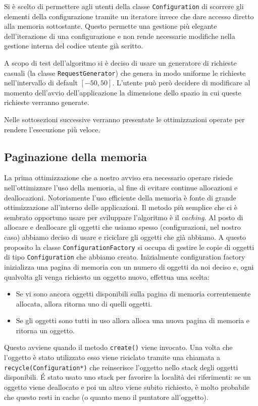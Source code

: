 \documentclass[a4paper, 10pt]{article}
\begin{document}
Si è scelto di permettere agli utenti della 
classe \texttt{Configuration} di scorrere gli elementi della configurazione
tramite un iteratore invece che dare accesso diretto alla memoria sottostante.
Questo permette una gestione più elegante dell'iterazione di una configurazione e non rende necessarie modifiche nella gestione interna del codice utente già scritto.

A scopo di test dell'algoritmo si è deciso di usare un generatore di richieste
casuali (la classe \texttt{RequestGenerator}) che genera in modo uniforme le 
richieste nell'intervallo di default $[-50, 50]$. L'utente può però decidere di modificare al momento dell'avvio dell'applicazione la dimensione dello spazio in cui queste richieste verranno generate. 

Nelle sottosezioni successive verranno presentate le ottimizzazioni operate
per rendere l'esecuzione più veloce. 

\subsection{Paginazione della memoria}
La prima ottimizzazione che a nostro avviso era necessario operare risiede 
nell'ottimizzare l'uso della memoria, al fine di evitare continue allocazioni e
deallocazioni. Notoriamente l'uso efficiente della memoria è fonte di grande
ottimizzazione all'interno delle applicazioni. Il metodo più semplice che 
ci è sembrato opportuno usare per sviluppare l'algoritmo è il \emph{caching}.
Al posto di allocare e deallocare gli oggetti che usiamo spesso (configurazioni,
nel nostro caso) abbiamo deciso di usare e riciclare gli oggetti che già abbiamo.
A questo proposito la classe \texttt{ConfigurationFactory} si occupa di gestire
le copie di oggetti di tipo \texttt{Configuration} che abbiamo creato. 
Inizialmente configuration factory inizializza una pagina di memoria con 
un numero di oggetti da noi deciso e, ogni qualvolta gli venga richiesto un 
oggetto nuovo, effettua una scelta:
\begin{itemize}
  \item Se vi sono ancora oggetti disponibili sulla pagina di memoria correntemente allocata, allora ritorna uno di quelli oggetti.
  \item Se gli oggetti sono tutti in uso allora alloca una nuova pagina di 
  memoria e ritorna un oggetto.
\end{itemize}
Questo avviene quando il metodo \texttt{create()} viene invocato. Una volta 
che l'oggetto è stato utilizzato esso viene riciclato tramite una 
chiamata a \\\texttt{recycle(Configuration*)} che reinserisce l'oggetto nello 
stack degli oggetti disponibili. \'E stato usato uno stack per favorire la 
località dei riferimenti: se un oggetto viene deallocato e poi un altro viene subito richiesto, è molto probabile che questo resti in cache (o quanto meno il 
puntatore all'oggetto).
\end{document}
